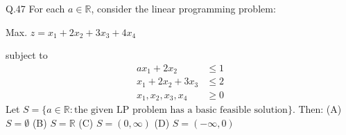 \documentclass{article}
\begin{document}
																																																																																 \vspace{1em}
																																																																																 Q.47 \quad For each $a \in \mathbb{R}$, consider the linear programming problem:
																																																																																    \begin{flushleft}
																																																																																    \hspace{3cm} Max. $z = x_1 + 2x_2 + 3x_3 + 4x_4$
																																																																																       \end{flushleft}
																																																																																           \hspace{3cm} subject to
																																																																																	       \begin{align*}
																																																																																	               ax_1 + 2x_2 &\leq 1 \\
																																																																																		               x_1 + 2x_2 + 3x_3 &\leq 2 \\
																																																																																			               x_1, x_2, x_3, x_4 &\geq 0
																																																																																				           \end{align*}
																																																																																					       Let $S = \{a \in \mathbb{R} : \text{the given LP problem has a basic feasible solution}\}$. Then:
																																																																																					           \newline
																																																																																						   \noindent (A)  $S = \emptyset$ \hspace{5.75cm} (B)  $S = \mathbb{R}$
																																																																																						   \newline \noindent (C) $S = (0, \infty)$ \hspace{5cm}  (D) $S = (-\infty, 0)$
																																																																																						   \vspace{1em}
																																																																																						   \newline 
\end{document}
